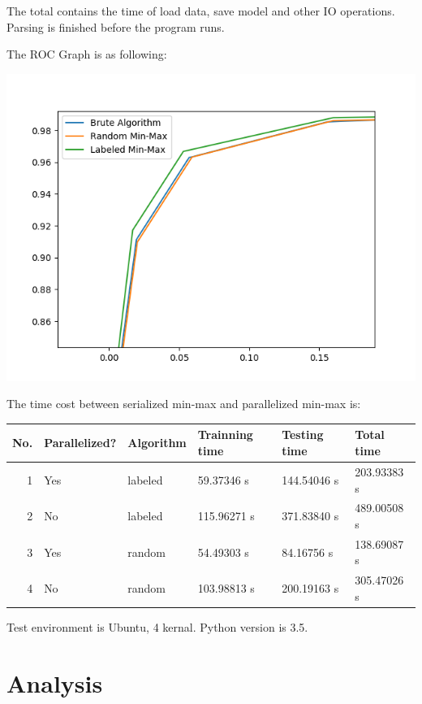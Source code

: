 \documentclass[11pt]{article}
\begin{document}
The total contains the time of load data, save model and other IO operations.
Parsing is finished before the program runs.

The ROC Graph is as following:


\includegraphics[width=.9\linewidth]{figure_1.png}



The time cost between serialized min-max and parallelized min-max is:

\begin{center}
\begin{tabular}{rlllll}
\hline
No. & Parallelized? & Algorithm & Trainning time & Testing time & Total time\\
\hline
1 & Yes & labeled & 59.37346 s & 144.54046 s & 203.93383 s\\
2 & No & labeled & 115.96271 s & 371.83840 s & 489.00508 s\\
3 & Yes & random & 54.49303 s & 84.16756 s & 138.69087 s\\
4 & No & random & 103.98813 s & 200.19163 s & 305.47026 s\\
\hline
\end{tabular}
\end{center}


Test environment is Ubuntu, 4 kernal.
Python version is 3.5.
\section{Analysis}
\label{sec-5}
\end{document}

